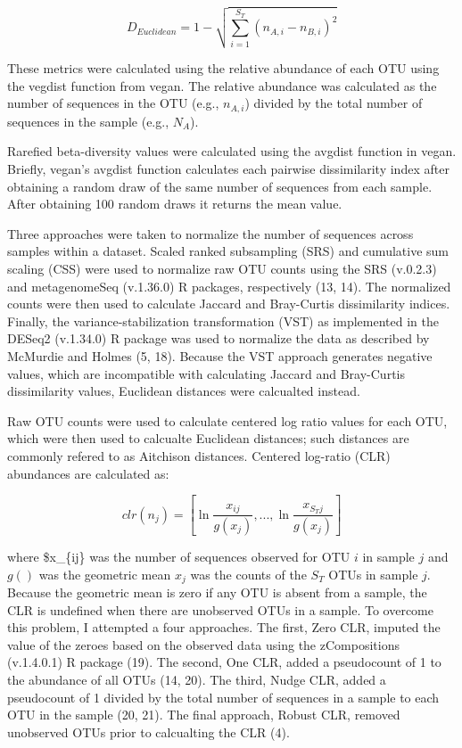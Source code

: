 \documentclass[
]{article}
\begin{document}
\[D_{Euclidean}=1-\sqrt{\sum_{i=1}^{S_T}\left(n_{A,i} - n_{B,i}\right)^2}\]

These metrics were calculated using the relative abundance of each OTU
using the vegdist function from vegan. The relative abundance was
calculated as the number of sequences in the OTU (e.g., \(n_{A,i}\))
divided by the total number of sequences in the sample (e.g., \(N_A\)).

Rarefied beta-diversity values were calculated using the avgdist
function in vegan. Briefly, vegan's avgdist function calculates each
pairwise dissimilarity index after obtaining a random draw of the same
number of sequences from each sample. After obtaining 100 random draws
it returns the mean value.

Three approaches were taken to normalize the number of sequences across
samples within a dataset. Scaled ranked subsampling (SRS) and cumulative
sum scaling (CSS) were used to normalize raw OTU counts using the SRS
(v.0.2.3) and metagenomeSeq (v.1.36.0) R packages, respectively (13,
14). The normalized counts were then used to calculate Jaccard and
Bray-Curtis dissimilarity indices. Finally, the variance-stabilization
transformation (VST) as implemented in the DESeq2 (v.1.34.0) R package
was used to normalize the data as described by McMurdie and Holmes (5,
18). Because the VST approach generates negative values, which are
incompatible with calculating Jaccard and Bray-Curtis dissimilarity
values, Euclidean distances were calcualted instead.

Raw OTU counts were used to calculate centered log ratio values for each
OTU, which were then used to calcualte Euclidean distances; such
distances are commonly refered to as Aitchison distances. Centered
log-ratio (CLR) abundances are calculated as:

\[
clr\left(n_j\right) = \left[ \ln\frac{x_{ij}}{g(x_j)}, ..., \ln\frac{x_{S_Tj}}{g(x_j)}\right]
\]

where \$x\_\{ij\} was the number of sequences observed for OTU \(i\) in
sample \(j\) and \(g()\) was the geometric mean \(x_j\) was the counts
of the \(S_T\) OTUs in sample \(j\). Because the geometric mean is zero
if any OTU is absent from a sample, the CLR is undefined when there are
unobserved OTUs in a sample. To overcome this problem, I attempted a
four approaches. The first, Zero CLR, imputed the value of the zeroes
based on the observed data using the zCompositions (v.1.4.0.1) R package
(19). The second, One CLR, added a pseudocount of 1 to the abundance of
all OTUs (14, 20). The third, Nudge CLR, added a pseudocount of 1
divided by the total number of sequences in a sample to each OTU in the
sample (20, 21). The final approach, Robust CLR, removed unobserved OTUs
prior to calcualting the CLR (4).
\end{document}
